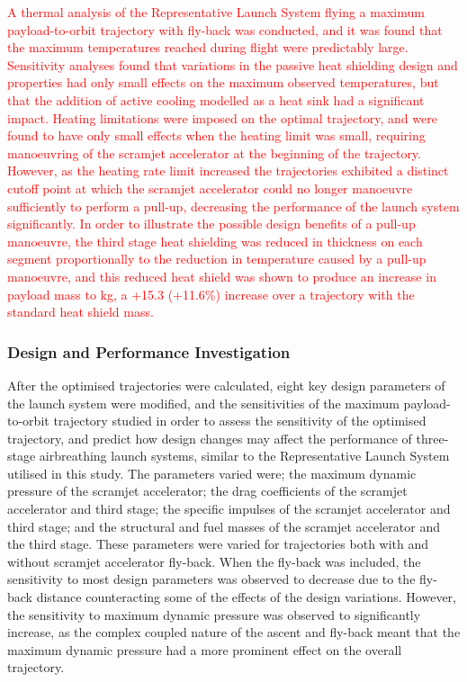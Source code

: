  \textcolor{red}{A thermal analysis of the Representative Launch System flying a maximum payload-to-orbit trajectory with fly-back was conducted, and it was found that the maximum temperatures reached during flight were predictably large. Sensitivity analyses found that variations in the passive heat shielding design and properties had only small effects on the maximum observed temperatures, but that the addition of active cooling modelled as a heat sink had a significant impact. 
 	Heating limitations were imposed on the optimal trajectory, and were found to have only small effects when the heating limit was small, requiring manoeuvring of the scramjet accelerator at the beginning of the trajectory. However, as the heating rate limit increased the trajectories exhibited a distinct cutoff point at which the scramjet accelerator could no longer manoeuvre sufficiently to perform a pull-up, decreasing the performance of the launch system significantly. 
 	In order to illustrate the possible design benefits of a pull-up manoeuvre, the third stage heat shielding was reduced in thickness on each segment proportionally to the reduction in temperature caused by a pull-up manoeuvre, and this reduced heat shield was shown to produce an increase in payload mass to \PayloadToOrbitTPSreduced kg, a +15.3 (+11.6\%) increase over a trajectory with the standard heat shield mass.}
	
	\subsubsection{Design and Performance Investigation}
After the optimised trajectories were calculated, eight key design parameters of the launch system were modified, and the sensitivities of the maximum payload-to-orbit trajectory studied in order to assess the sensitivity of the optimised trajectory, and predict how design changes may affect the performance of three-stage airbreathing launch systems, similar to the Representative Launch System utilised in this study.
The parameters varied were; the maximum dynamic pressure of the scramjet accelerator; the drag coefficients of the scramjet accelerator and third stage; the specific impulses of the scramjet accelerator and third stage; and the structural and fuel masses of the scramjet accelerator and the third stage. 
These parameters were varied for trajectories both with and without scramjet accelerator fly-back. When the fly-back was included, the sensitivity to most design parameters was observed to decrease due to the fly-back distance counteracting some of the effects of the design variations. However, the sensitivity to maximum dynamic pressure was observed to significantly increase, as the complex coupled nature of the ascent and fly-back meant that the maximum dynamic pressure had a more prominent effect on the overall trajectory. 

